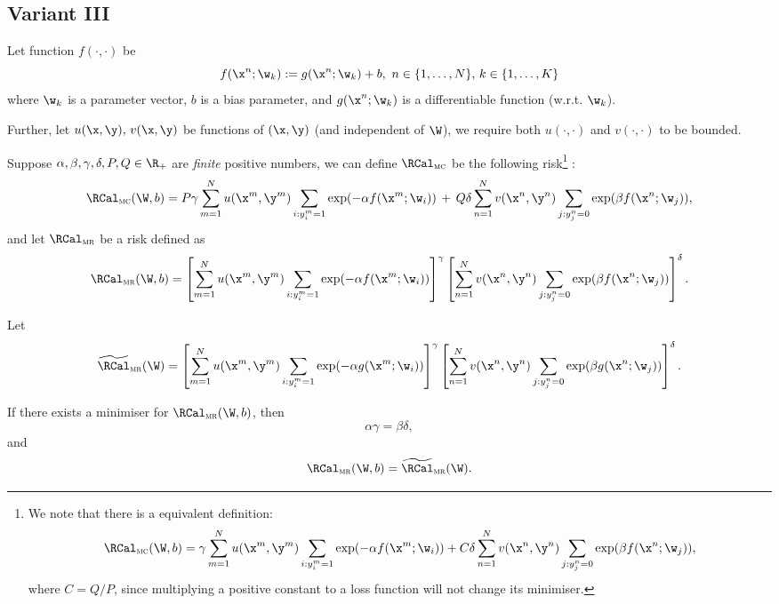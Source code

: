 \subsection{Variant III}


Let function $f(\cdot, \cdot)$ be
$$
f(\x^n; \w_k) := g(\x^n; \w_k) + b, \ n \in \{1,\dots,N\}, \, k \in \{1,\dots,K\}
$$
where $\w_k$ is a parameter vector, $b$ is a bias parameter, 
and $g(\x^n; \w_k)$ is a differentiable function (w.r.t. $\w_k$).

Further, let $u(\x, \y), \, v(\x, \y)$ be functions of $(\x, \y)$ (and independent of $\W$), 
we require both $u(\cdot,\cdot)$ and $v(\cdot,\cdot)$ to be bounded.

Suppose $\alpha, \beta, \gamma, \delta, P, Q \in \R_+$ are \emph{finite} positive numbers, 
we can define $\RCal_\textsc{mc}$ be the following risk\footnote{
We note that there is a equivalent definition:
$$
\RCal_\textsc{mc}(\W, b) 
= \gamma \sum_{m=1}^N u(\x^m, \y^m) \sum_{i: y_i^m=1} \exp(-\alpha f(\x^m; \w_i)) + 
C \delta \sum_{n=1}^N v(\x^n, \y^n) \sum_{j: y_j^n=0} \exp(\beta  f(\x^n; \w_j)),
$$
where $C = Q/P$, since multiplying a positive constant to a loss function will not change its minimiser.}
:
\begin{equation}
\label{eq:mc}
\RCal_\textsc{mc}(\W, b) = P \gamma \sum_{m=1}^N u(\x^m, \y^m) \sum_{i: y_i^m = 1} \exp(-\alpha f(\x^m; \w_i)) \, + \,
                           Q \delta \sum_{n=1}^N v(\x^n, \y^n) \sum_{j: y_j^n = 0} \exp( \beta  f(\x^n; \w_j)),
\end{equation}
and let $\RCal_\textsc{mr}$ be a risk defined as
\begin{equation}
\label{eq:mr}
\RCal_\textsc{mr}(\W, b) 
= \left[ \sum_{m=1}^N u(\x^m, \y^m) \sum_{i: y_i^m = 1} \exp(-\alpha f(\x^m; \w_i)) \right]^\gamma  
  \left[ \sum_{n=1}^N v(\x^n, \y^n) \sum_{j: y_j^n = 0} \exp( \beta  f(\x^n; \w_j)) \right]^\delta.
\end{equation}

Let 
\begin{equation}
\label{eq:mr}
\widetilde\RCal_\textsc{mr}(\W) 
= \left[ \sum_{m=1}^N u(\x^m, \y^m) \sum_{i: y_i^m = 1} \exp(-\alpha g(\x^m; \w_i)) \right]^\gamma  
  \left[ \sum_{n=1}^N v(\x^n, \y^n) \sum_{j: y_j^n = 0} \exp( \beta  g(\x^n; \w_j)) \right]^\delta.
\end{equation}


\begin{lemma}
\label{lemma:basic_ml}
If there exists a minimiser for $\RCal_\textsc{mr}(\W, b)$, then
$$
\alpha \gamma = \beta \delta,
$$
and 
$$
\RCal_\textsc{mr}(\W, b) = \widetilde\RCal_\textsc{mr}(\W).
$$
\end{lemma}


